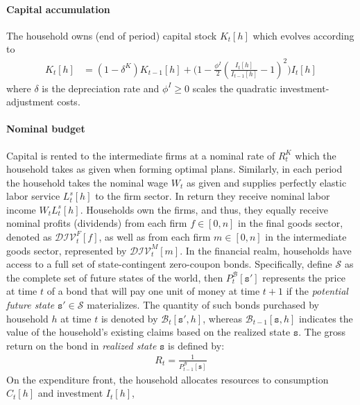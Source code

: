 \paragraph{Capital accumulation}
The household owns (end of period) capital stock \(K_{t}[h]\) which evolves according to
\begin{align}
K_{t}[h] &= (1-\delta^{K}) K_{t-1}[h] + \Biggl( 1 - \frac{\phi^{I}}{2} {\left(\frac{I_{t}[h]}{I_{t-1}[h]} - 1 \right)}^2 \Biggr) I_{t}[h] \label{eq:NewKeynesian.CapitalAccumulation}
\end{align}
where \(\delta \) is the depreciation rate and \(\phi^{I} \geq 0\) scales the quadratic investment-adjustment costs.

\paragraph{Nominal budget}
Capital is rented to the intermediate firms at a nominal rate of \(R^{K}_{t}\) which the household takes as given when forming optimal plans.
Similarly, in each period the household takes the nominal wage \(W_{t}\) as given
  and supplies perfectly elastic labor service \(L^{s}_{t}[h]\) to the firm sector.
In return they receive nominal labor income \(W_t L^{s}_{t}[h]\).
Households own the firms, and thus, they equally receive nominal profits (dividends)
  from each firm \(f\in[0,n]\) in the final goods sector, denoted as \(\mathcal{DIV}^{F}_{t}[f]\),
  as well as from each firm \(m\in[0,n]\) in the intermediate goods sector, represented by \(\mathcal{DIV}^{M}_{t}[m]\).
In the financial realm, households have access to a full set of state-contingent zero-coupon bonds.
Specifically, define \(\mathcal{S}\) as the complete set of future states of the world,
  then \(P^{\mathcal{B}}_{t}[\mathtt{s}']\) represents the price at time \(t\) of a bond that will pay one unit of money at time \(t+1\)
  if the \emph{potential future state} \(\mathcal{\mathtt{s}' \in \mathcal{S}}\) materializes.
The quantity of such bonds purchased by household \(h\) at time \(t\) is denoted by \(\mathcal{B}_{t}[\mathtt{s}',h]\),
  whereas \(\mathcal{B}_{t-1}[\mathtt{s},h]\) indicates the value of the household's existing claims based on the realized state \(\mathtt{s}\).
The gross return on the bond in \emph{realized state} \(\mathtt{s}\) is defined by:
\begin{align}
R_{t} = \frac{1}{P^{\mathcal{B}}_{t-1}[\mathtt{s}]} \label{eq:NewKeynesian.BondPriceInterestRate}
\end{align}
On the expenditure front, the household allocates resources to consumption \(C_{t}[h]\) and investment \(I_{t}[h]\),
